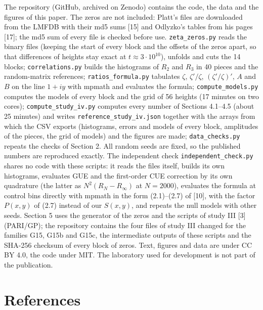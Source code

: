 \documentclass[
  10pt,
]{article}
\begin{document}
The repository (GitHub, archived on Zenodo) contains the code, the data
and the figures of this paper. The zeros are not included: Platt's files
are downloaded from the LMFDB with their md5 sums {[}15{]} and Odlyzko's
tables from his pages {[}17{]}; the md5 sum of every file is checked
before use. \texttt{zeta\_zeros.py} reads the binary files (keeping the
start of every block and the offsets of the zeros apart, so that
differences of heights stay exact at \(t \approx 3\cdot10^{10}\)),
unfolds and cuts the 14 blocks; \texttt{correlations.py} builds the
histograms of \(R_2\) and \(R_3\) in 40 pieces and the random-matrix
references; \texttt{ratios\_formula.py} tabulates \(\zeta\),
\(\zeta'/\zeta\), \((\zeta'/\zeta)'\), \(A\) and \(B\) on the line
\(1 + iy\) with mpmath and evaluates the formula;
\texttt{compute\_models.py} computes the models of every block and the
grid of 56 heights (17 minutes on two cores);
\texttt{compute\_study\_iv.py} computes every number of Sections
4.1--4.5 (about 25 minutes) and writes
\texttt{reference\_study\_iv.json} together with the arrays from which
the CSV exports (histograms, errors and models of every block,
amplitudes of the pieces, the grid of models) and the figures are made;
\texttt{data\_checks.py} repeats the checks of Section 2. All random
seeds are fixed, so the published numbers are reproduced exactly. The
independent check \texttt{independent\_check.py} shares no code with
these scripts: it reads the files itself, builds its own histograms,
evaluates GUE and the first-order CUE correction by its own quadrature
(the latter as \(N^2(R_N - R_\infty)\) at \(N = 2000\)), evaluates the
formula at control bins directly with mpmath in the form (2.1)--(2.7) of
{[}10{]}, with the factor \(P(x, y)\) of (2.7) instead of our
\(S(x, y)\), and repeats the null models with other seeds. Section 5
uses the generator of the zeros and the scripts of study III {[}3{]}
(PARI/GP); the repository contains the four files of study III changed
for the families G15, G15b and G15c, the intermediate outputs of these
scripts and the SHA-256 checksum of every block of zeros. Text, figures
and data are under CC BY 4.0, the code under MIT. The laboratory used
for development is not part of the publication.

\hypertarget{references}{%
\section{References}\label{references}}
\small
\end{document}
